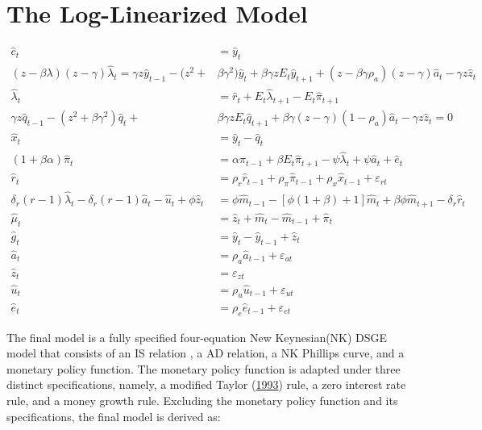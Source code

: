 \documentclass[11pt,preprint, authoryear]{elsarticle}
\numberwithin{equation}{section}
\numberwithin{figure}{section}
\numberwithin{table}{section}
\begin{document}
\hypertarget{the-log-linearized-model}{%
\section{The Log-Linearized Model}\label{the-log-linearized-model}}

\begin{align}
\hat{c}_t &= \hat{y}_t \label{47}  \\
(z -\beta\lambda)(z-\gamma)\hat{\lambda}_t =\gamma z\hat{y}_{t-1} -(z^2 + &\beta\gamma^2)\hat{y}_t + \beta\gamma z E_t\hat{y}_{t+1} +(z-\beta\gamma\rho_a)(z-\gamma) \hat{a}_t -\gamma z \hat{z}_t \label{48}  \\
\hat{\lambda}_t &= \hat{r}_t +E_t \hat{\lambda}_{t+1} -E_t  \hat{\pi}_{t+1} \label{49}  \\
\gamma z \hat{q}_{t-1} -(z^2 +\beta\gamma^2) \hat{q}_t +&\beta \gamma z E_t  \hat{q}_{t+1} + \beta \gamma(z-\gamma)(1-\rho_a)  \hat{a}_t -\gamma z  \hat{z}_t = 0 \label{50}  \\
\hat{x}_t &= \hat{y}_t - \hat{q}_t \label{51}  \\
(1+\beta \alpha)\hat{\pi}_t &= \alpha \hat{\pi}_{t-1} + \beta E_t  \hat{\pi}_{t+1} -\psi  \hat{\lambda}_t +\psi   \hat{a}_t  + \hat{e}_t \label{52}  \\
\hat{r}_t &= \rho_r  \hat{r}_{t-1} +\rho_\pi   \hat{\pi}_{t-1} + \rho_x   \hat{x}_{t-1} +  \varepsilon_{r t} \label{53}  \\
\delta_r (r-1) \hat{\lambda}_t-\delta_r (r-1) \hat{a}_t - \hat{u}_t +\phi \hat{z}_t &= \phi \hat{m}_{t-1} -\left[\phi(1+\beta) +1 \right] \hat{m}_t +\beta \phi  \hat{m}_{t+1} - \delta_r  \hat{r}_t \label{54}  \\
\hat{\mu}_t &= \hat{z}_t +  \hat{m}_t -  \hat{m}_{t-1} + \hat{\pi}_t \label{55}   \\
\hat{g}_t &= \hat{y}_t -  \hat{y}_{t-1} +   \hat{z}_t \label{56}  \\
\hat{a}_t &= \rho_a  \hat{a}_{t-1} + \varepsilon_{a t} \label{57}  \\    
\hat{z}_t &= \varepsilon_{z t} \label{58}  \\
\hat{u}_t &= \rho_u  \hat{u}_{t-1} +\varepsilon_{u t} \label{59}  \\
\hat{e}_t &= \rho_e  \hat{e}_{t-1} +\varepsilon_{e t} \label{60}  
\end{align}

The final model is a fully specified four-equation New Keynesian(NK)
DSGE model that consists of an IS relation , a AD relation, a NK
Phillips curve, and a monetary policy function. The monetary policy
function is adapted under three distinct specifications, namely, a
modified Taylor (\protect\hyperlink{ref-taylor1993}{1993}) rule, a zero
interest rate rule, and a money growth rule. Excluding the monetary
policy function and its specifications, the final model is derived as:
\end{document}
